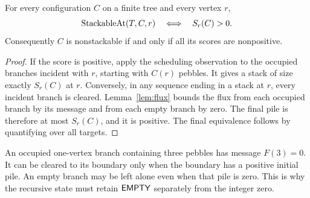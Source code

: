 \begin{theorem}\label{thm:root-score}
For every configuration $C$ on a finite tree and every vertex $r$,
\[
 \operatorname{StackableAt}(T,C,r)\quad\Longleftrightarrow\quad S_r(C)>0.
\]
Consequently $C$ is nonstackable if and only if all its scores are
nonpositive.
\end{theorem}
\begin{proof}
If the score is positive, apply the scheduling observation to the occupied
branches incident with $r$, starting with $C(r)$ pebbles. It gives a stack
of size exactly $S_r(C)$ at $r$.
Conversely, in any sequence ending in a stack at $r$, every incident
branch is cleared. Lemma~\ref{lem:flux} bounds the flux from each occupied
branch by its message and from each empty branch by zero. The final pile
is therefore at most $S_r(C)$, and it is positive.
The final equivalence follows by quantifying over all targets.
\end{proof}

\begin{remark}
An occupied one-vertex branch containing three pebbles has message
$F(3)=0$. It can be cleared to its boundary only when the boundary has a
positive initial pile. An empty branch may be left alone even when that
pile is zero. This is why the recursive state must retain $\mathsf{EMPTY}$
separately from the integer zero.
\end{remark}

